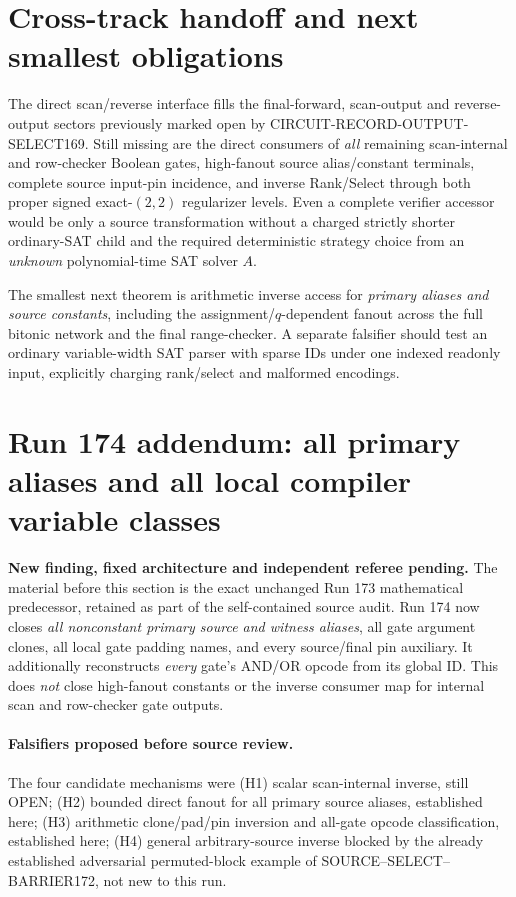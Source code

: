 \documentclass[11pt]{article}
\begin{document}
\section{Cross-track handoff and next smallest obligations}
The direct scan/reverse interface fills the final-forward,
scan-output and reverse-output sectors previously marked open
by CIRCUIT-RECORD-OUTPUT-SELECT169. Still missing are the direct
consumers of \emph{all} remaining scan-internal and row-checker
Boolean gates, high-fanout source alias/constant terminals,
complete source input-pin incidence, and inverse Rank/Select
through both proper signed exact-$(2,2)$ regularizer levels.
Even a complete verifier accessor would be only a source
transformation without a charged strictly shorter ordinary-SAT
child and the required deterministic strategy choice from an
\emph{unknown} polynomial-time SAT solver $A$.

The smallest next theorem is arithmetic inverse access for
\emph{primary aliases and source constants}, including the
assignment/$q$-dependent fanout across the full bitonic
network and the final range-checker. A separate falsifier
should test an ordinary variable-width SAT parser with sparse
IDs under one indexed readonly input, explicitly charging
rank/select and malformed encodings.


\clearpage
\section{Run 174 addendum: all primary aliases and all local compiler variable classes}
\noindent\textbf{New finding, fixed architecture and independent referee pending.}
The material before this section is the exact unchanged Run 173 mathematical
predecessor, retained as part of the self-contained source audit. Run 174 now
closes \emph{all nonconstant primary source and witness aliases}, all gate
argument clones, all local gate padding names, and every source/final pin
auxiliary. It additionally reconstructs \emph{every} gate's AND/OR opcode from
its global ID. This does \emph{not} close high-fanout constants or the inverse
consumer map for internal scan and row-checker gate outputs.

\paragraph{Falsifiers proposed before source review.}
The four candidate mechanisms were (H1) scalar scan-internal inverse,
still OPEN; (H2) bounded direct fanout for all primary source aliases,
established here; (H3) arithmetic clone/pad/pin inversion and all-gate opcode
classification, established here; (H4) general arbitrary-source inverse
blocked by the already established adversarial permuted-block example of
SOURCE--SELECT--BARRIER172, not new to this run.
\end{document}
